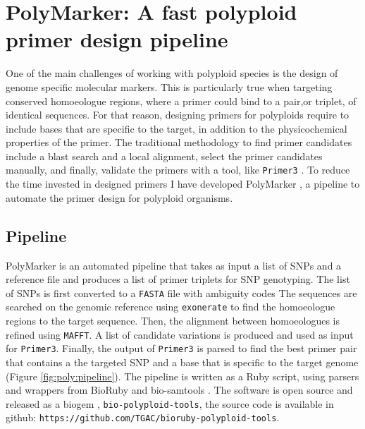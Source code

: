 
\chapter{PolyMarker: A fast polyploid primer design pipeline}
One of the main challenges of working with polyploid species is the design of genome specific molecular markers. 
This is particularly true when targeting conserved homoeologue regions, where a primer could bind to a pair,or triplet, of identical sequences. 
For that reason, designing primers for polyploids require to include bases that are specific to the target, in addition to the physicochemical properties of the primer.  
The traditional methodology to find primer candidates include a blast search and a local alignment, select the primer candidates manually, and finally, validate the primers with a tool, like \texttt{Primer3} \citep{Rozen}. 
To reduce the time invested in designed primers I have developed PolyMarker \citep{Ramirez-Gonzalez2015a}, a pipeline to automate the primer design for polyploid organisms.  

\section{Pipeline}
PolyMarker is an automated pipeline that takes as input a list of SNPs and a reference file and produces a list of primer triplets for SNP genotyping. 
The list of SNPs is first converted to a \texttt{FASTA} file with ambiguity codes\citep{Cornish-Bowden1985} 
The sequences are searched on the genomic reference using \texttt{exonerate} \citep{Slater2005} to find the homoeologue regions to the target sequence. 
Then, the alignment between homoeologues is refined using \texttt{MAFFT}\citep{Katoh2013}. 
A list of candidate variations is produced and used as input for \texttt{Primer3}\citep{Rozen}. 
Finally, the output of \texttt{Primer3} is parsed to find the best primer pair that contains a the targeted SNP and a base that is specific to the target genome (Figure \ref{fig:poly:pipeline}).  
The pipeline is written as a Ruby script, using parsers and wrappers from BioRuby \citep{Goto2010} and bio-samtools \citep{Etherington2015,Ramirez-Gonzalez2012}. 
The software is open source and released as a biogem \citep{Bonnal2012}, \texttt{bio-polyploid-tools}, the source code is available in github: \texttt{https://github.com/TGAC/bioruby-polyploid-tools}.

